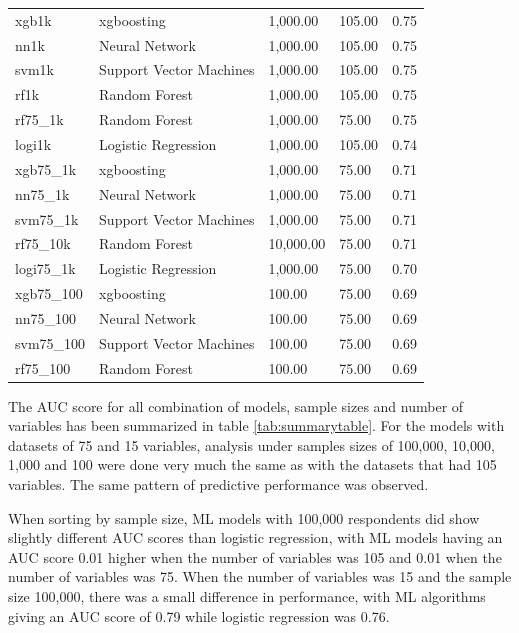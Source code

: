 \documentclass[
  man]{apa7}
\begin{document}
\begin{center}
\begin{ThreePartTable}
\begin{longtable}{lllll}
xgb1k & xgboosting & 1,000.00 & 105.00 & 0.75\\
nn1k & Neural Network & 1,000.00 & 105.00 & 0.75\\
svm1k & Support Vector Machines & 1,000.00 & 105.00 & 0.75\\
rf1k & Random Forest & 1,000.00 & 105.00 & 0.75\\
rf75\_1k & Random Forest & 1,000.00 & 75.00 & 0.75\\
logi1k & Logistic Regression & 1,000.00 & 105.00 & 0.74\\
xgb75\_1k & xgboosting & 1,000.00 & 75.00 & 0.71\\
nn75\_1k & Neural Network & 1,000.00 & 75.00 & 0.71\\
svm75\_1k & Support Vector Machines & 1,000.00 & 75.00 & 0.71\\
rf75\_10k & Random Forest & 10,000.00 & 75.00 & 0.71\\
logi75\_1k & Logistic Regression & 1,000.00 & 75.00 & 0.70\\
xgb75\_100 & xgboosting & 100.00 & 75.00 & 0.69\\
nn75\_100 & Neural Network & 100.00 & 75.00 & 0.69\\
svm75\_100 & Support Vector Machines & 100.00 & 75.00 & 0.69\\
rf75\_100 & Random Forest & 100.00 & 75.00 & 0.69\\
\bottomrule
\end{longtable}

\end{ThreePartTable}
\end{center}

The AUC score for all combination of models, sample sizes and number of variables has been summarized in table \ref{tab:summarytable}. For the models with datasets of 75 and 15 variables, analysis under samples sizes of 100,000, 10,000, 1,000 and 100 were done very much the same as with the datasets that had 105 variables. The same pattern of predictive performance was observed.

When sorting by sample size, ML models with 100,000 respondents did show slightly different AUC scores than logistic regression, with ML models having an AUC score 0.01 higher when the number of variables was 105 and 0.01 when the number of variables was 75. When the number of variables was 15 and the sample size 100,000, there was a small difference in performance, with ML algorithms giving an AUC score of 0.79 while logistic regression was 0.76.
\end{document}
